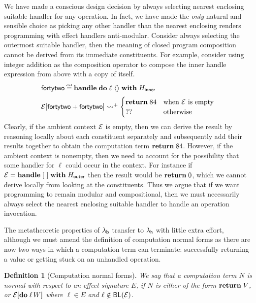 \documentclass[12pt,phd,lfcs,twoside,openright,logo,leftchapter,normalheadings]{infthesis}
\theoremstyle{plain}
\newtheorem{definition}[theorem]{Definition}
\theoremstyle{definition}
\begin{document}
We have made a conscious design decision by always selecting nearest
enclosing suitable handler for any operation. In fact, we have made
the \emph{only} natural and sensible choice as picking any other
handler than the nearest enclosing renders programming with effect
handlers anti-modular. Consider always selecting the outermost
suitable handler, then the meaning of closed program composition
cannot be derived from its immediate constituents. For example,
consider using integer addition as the composition operator to compose
the inner handle expression from above with a copy of itself.
%
\[
  \bl
      \dec{fortytwo} \defas \Handle\;\Do\;\ell~\Unit\;\With\;H_{\mathsf{inner}} \medskip\\
      \EC[\dec{fortytwo} + \dec{fortytwo}] \reducesto^+ \begin{cases}
                                                          \Return\; 84 & \text{when $\EC$ is empty}\\
                                                          ?? & \text{otherwise}
                                                        \end{cases}
  \el
\]
%
Clearly, if the ambient context $\mathcal{E}$ is empty, then we can derive the
result by reasoning locally about each constituent separately and
subsequently add their results together to obtain the computation term
$\mathbf{return}\;84$. However, if the ambient context is nonempty, then we
need to account for the possibility that some handler for $\ell$ could
occur in the context. For instance if
$\mathcal{E} = \mathbf{handle}\;[~]\;\mathbf{with}\;H_{\mathsf{outer}}$ then the result would
be $\mathbf{return}\;0$, which we cannot derive locally from looking at the
constituents. Thus we argue that if we want programming to remain
modular and compositional, then we must necessarily always select the
nearest enclosing suitable handler to handle an operation invocation.
%


The metatheoretic properties of $\lambda_{\mathsf{b}}$ transfer to $\lambda_{\mathsf{h}}$ with
little extra effort, although we must amend the definition of
computation normal forms as there are now two ways in which a
computation term can terminate: successfully returning a value or
getting stuck on an unhandled operation.
%
\begin{definition}[Computation normal forms]
  We say that a computation term $N$ is normal with respect to an
  effect signature $E$, if $N$ is either of the form $\mathbf{return}\;V$, or
  $\mathcal{E}[\mathbf{do}\;\ell\,W]$ where $\ell \in E$ and $\ell \notin \mathsf{BL}(\mathcal{E})$.
\end{definition}
%
\end{document}
